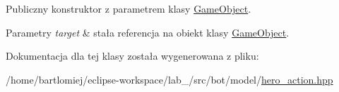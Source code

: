 Publiczny konstruktor z parametrem klasy \hyperlink{classmodel_1_1GameObject}{Game\+Object}. 


\begin{DoxyParams}{Parametry}
{\em target} & stała referencja na obiekt klasy \hyperlink{classmodel_1_1GameObject}{Game\+Object}. \\
\hline
\end{DoxyParams}


Dokumentacja dla tej klasy została wygenerowana z pliku\+:\begin{DoxyCompactItemize}
\item 
/home/bartlomiej/eclipse-\/workspace/lab\+\_/src/bot/model/\hyperlink{hero__action_8hpp}{hero\+\_\+action.\+hpp}\end{DoxyCompactItemize}
